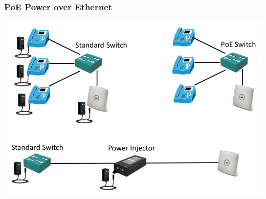 \documentclass[pdflatex,compress,mathserif]{beamer}
\begin{document}
\begin{frame}
	\frametitle{PoE Power over Ethernet}
	\begin{center}
		\includegraphics[width=\linewidth]{img/img03}
	\end{center}
\end{frame}
\end{document}
